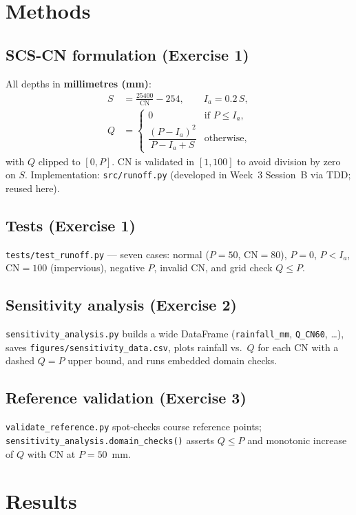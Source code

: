 \documentclass[11pt,a4paper]{article}
\begin{document}
\section{Methods}

\subsection{SCS-CN formulation (Exercise 1)}
All depths in \textbf{millimetres (mm)}:
\begin{align*}
S &= \frac{25400}{\mathrm{CN}} - 254, \qquad I_a = 0.2\,S, \\
Q &= \begin{cases}
0 & \text{if } P \le I_a, \\
\dfrac{(P-I_a)^2}{P - I_a + S} & \text{otherwise},
\end{cases}
\end{align*}
with $Q$ clipped to $[0,P]$. CN is validated in $[1,100]$ to avoid division by zero on $S$. Implementation: \texttt{src/runoff.py} (developed in Week~3 Session~B via TDD; reused here).

\subsection{Tests (Exercise 1)}
\texttt{tests/test\_runoff.py} --- seven cases: normal ($P{=}50$, CN${=}80$), $P{=}0$, $P<I_a$, CN${=}100$ (impervious), negative $P$, invalid CN, and grid check $Q\le P$.

\subsection{Sensitivity analysis (Exercise 2)}
\texttt{sensitivity\_analysis.py} builds a wide DataFrame (\texttt{rainfall\_mm}, \texttt{Q\_CN60}, \ldots), saves \texttt{figures/sensitivity\_data.csv}, plots rainfall vs.\ $Q$ for each CN with a dashed $Q=P$ upper bound, and runs embedded domain checks.

\subsection{Reference validation (Exercise 3)}
\texttt{validate\_reference.py} spot-checks course reference points; \texttt{sensitivity\_analysis.domain\_checks()} asserts $Q\le P$ and monotonic increase of $Q$ with CN at $P{=}50$~mm.

\section{Results}
\end{document}
